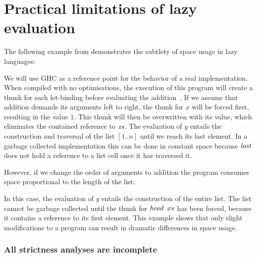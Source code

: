 
\section{Practical limitations of lazy evaluation}
\label{intro:lazy}

The following example from \cite{gustavsson:space-improvement} demonstrates the subtlety of space usage in lazy languages:


We will use GHC as a reference point for the behavior of a real implementation. When compiled with no optimisations, the execution of this program will create a thunk for each let-binding before evaluating the addition~\cite{peyton-jones:g-machine}. If we assume that addition demands its arguments left to right, the thunk for $x$ will be forced first, resulting in the value $1$. This thunk will then be overwritten with its value, which eliminates the contained reference to $\operatorname{\mathit{xs}}$. The evaluation of $y$ entails the construction and traversal of the list $[1..n]$ until we reach its last element. In a garbage collected implementation this can be done in constant space because $\operatorname{\mathit{last}}$ does not hold a reference to a list cell once it has traversed it.

However, if we change the order of arguments to addition the program consumes space proportional to the length of the list:


In this case, the evaluation of $y$ entails the construction of the entire list. The list cannot be garbage collected until the thunk for $\ihead \ xs$ has been forced, because it contains a reference to its first element. This example shows that only slight modifications to a program can result in dramatic differences in space usage.

\subsubsection{All strictness analyses are incomplete}

